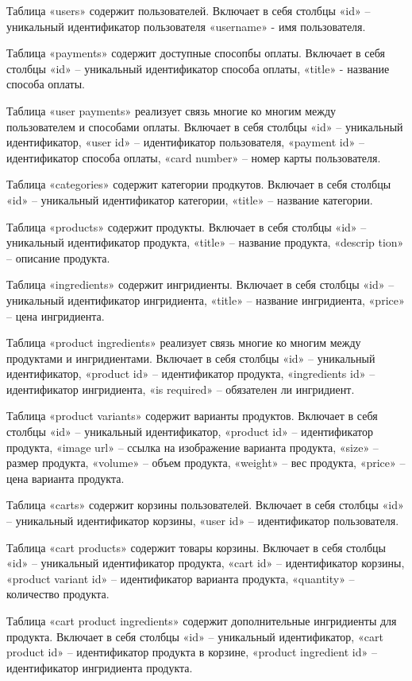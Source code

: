 \documentclass[a4paper,14pt]{extarticle}
\begin{document}
  Таблица «users» содержит пользователей. Включает в себя столбцы «id» -- уникальный идентификатор пользователя «username» - имя пользователя.

  Таблица «payments» содержит доступные спосопбы оплаты. Включает в себя столбцы «id» -- уникальный идентификатор способа оплаты, «title» - название способа оплаты.

  Таблица «user payments» реализует связь многие ко многим между пользователем и способами оплаты. Включает в себя столбцы «id» -- уникальный идентификатор, «user id» -- идентификатор пользователя, «payment id» -- идентификатор способа оплаты, «card number» -- номер карты пользователя.

  Таблица «categories» содержит категории продкутов. Включает в себя столбцы «id» -- уникальный идентификатор категории, «title» -- название категории.

  Таблица «products» содержит продукты. Включает в себя столбцы «id» -- уникальный идентификатор продукта, «title» -- название продукта,  «descrip tion» -- описание продукта.

  Таблица «ingredients» содержит ингридиенты. Включает в себя столбцы «id» -- уникальный идентификатор ингридиента, «title» -- название ингридиента, «price» -- цена ингридиента.

  Таблица «product ingredients» реализует связь многие ко многим между продуктами и ингридиентами. Включает в себя столбцы «id» -- уникальный идентификатор, «product id» -- идентификатор продукта, «ingredients id» -- идентификатор ингридиента, «is required» -- обязателен ли ингридиент.

  Таблица «product variants» содержит варианты продуктов. Включает в себя столбцы «id» -- уникальный идентификатор, «product id» -- идентификатор продукта, «image url» -- ссылка на изображение варианта продукта, «size» -- размер продукта, «volume» -- объем продукта, «weight» -- вес продукта, «price» -- цена варианта продукта.

  Таблица «carts» содержит корзины пользователей. Включает в себя столбцы «id» -- уникальный идентификатор корзины, «user id» -- идентификатор пользователя.

  Таблица «cart products» содержит товары корзины. Включает в себя столбцы «id» -- уникальный идентификатор продукта, «cart id» -- идентификатор корзины, «product variant id» -- идентификатор варианта продукта, «quantity» -- количество продукта.

  Таблица «cart product ingredients» содержит дополнительные ингридиенты для продукта. Включает в себя столбцы «id» -- уникальный идентификатор, «cart product id» -- идентификатор продукта в корзине, «product ingredient id» -- идентификатор ингридиента продукта.
\end{document}
